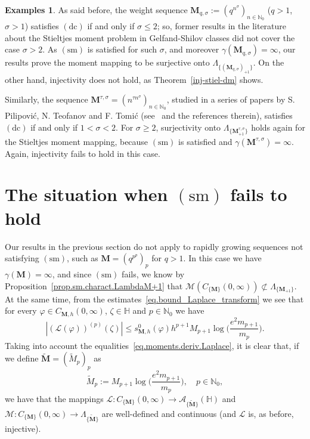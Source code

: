 \documentclass[12pt,a4paper]{article}
\newcommand{\N}{\mathbb{N}}
\newcommand{\HH}{\mathbb{H}}
\newcommand{\CM}{C_{\{\M\}}(0,\infty)}
\newcommand{\M}{{\boldsymbol{M}}}
\newcommand{\dc}{\operatorname{(dc)}}
\newcommand{\sm}{\operatorname{(sm)}}
\theoremstyle{plain}
\theoremstyle{definition}
\newtheorem{examples}[theorem]{Examples}
\numberwithin{equation}{section}
\begin{document}
\begin{examples}
\item[(i)] As said before, the weight sequence $\M_{q,\sigma}:=(q^{n^\sigma})_{n\in\N_0}$ ($q>1$, $\sigma>1$) satisfies $\dc$ if and only if $\sigma\le 2$; so, former results in the literature about the Stieltjes moment problem in Gelfand-Shilov classes did not cover the case $\sigma>2$. As $\sm$ is satisfied for such $\sigma$, and moreover $\gamma(\M_{q,\sigma})=\infty$, our results prove the moment mapping to be surjective onto $\Lambda_{\{(\M_{q,\sigma})_{+1}\}}$. On the other hand, injectivity does not hold, as Theorem~\ref{inj-stiel-dm} shows.
\item[(ii)] Similarly, the sequence $\M^{\tau,\sigma}=(n^{\tau n^{\sigma}})_{n\in\N_0}$, studied in a series of papers by S. Pilipovi\'c, N. Teofanov and F. Tomi\'c (see~\cite{PilipovicTeofanovTomic} and the references therein), satisfies $\dc$ if and only if $1<\sigma<2$. For $\sigma\ge 2$, surjectivity onto $\Lambda_{\{\M^{\tau,\sigma}_{+1}\}}$ holds again for the Stieltjes moment mapping, because $\sm$ is satisfied and $\gamma(\M^{\tau,\sigma})=\infty$. Again, injectivity fails to hold in this case.
\end{examples}



\section{The situation when $\sm$ fails to hold}\label{sect-Stiel-mom-problem-no-cond}


Our results in the previous section do not apply to rapidly growing sequences not satisfying $\sm$, such as $\M=(q^{p^p})_p$ for $q>1$. In this case we have $\gamma(\M)=\infty$, and since $\sm$ fails, we know by Proposition~\ref{prop.sm.charact.LambdaM+1} that $\mathcal{M}(\CM)\not\subset\Lambda_{\{\M_{+1}\}}$. At the same time, from the estimates~\eqref{eq.bound_Laplace_transform} we see that for every $\varphi\in C_{\M,h}(0,\infty)$, $\zeta\in\HH$ and $p\in\N_0$ we have
$$
|(\mathcal{L}(\varphi))^{(p)}(\zeta)|\le s_{\M,h}^0(\varphi)h^{p+1}M_{p+1}\log\big(\frac{e^2m_{p+1}}{m_p}\big).$$
Taking into account the equalities~\eqref{eq.moments.deriv.Laplace}, it is clear that, if we define $\widetilde{\M}=(\widetilde{M}_p)_p$ as
\begin{equation}\label{eq.defWidetildeM}
\widetilde{M}_p:=M_{p+1}\log\big(\frac{e^2m_{p+1}}{m_p}\big),\quad p\in\N_0,
\end{equation}
we have that the mappings $\mathcal{L}\colon C_{\{\M\}}(0,\infty)\to \mathcal{A}_{\{\widetilde{\M}\}}(\HH)$ and $\mathcal{M}\colon \CM \rightarrow \Lambda_{\{\widetilde{\M}\}}$
are well-defined and continuous (and $\mathcal{L}$ is, as before, injective).
\end{document}
